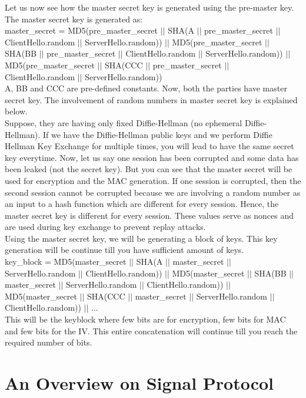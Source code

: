 \documentclass[11pt]{article}
\begin{document}
Let us now see how the master secret key is generated using the pre-master key. The master secret key is generated as:\\
master\_secret = MD5(pre\_master\_secret $||$ SHA(A $||$ pre\_master\_secret $||$ ClientHello.random $||$ ServerHello.random)) $||$ MD5(pre\_master\_secret $||$ SHA(BB $||$ pre\_master\_secret $||$ ClientHello.random $||$ ServerHello.random)) $||$ MD5(pre\_master\_secret $||$ SHA(CCC $||$ pre\_master\_secret $||$ ClientHello.random $||$ ServerHello.random))\\
A, BB and CCC are pre-defined constants. Now, both the parties have master secret key. The involvement of random numbers in master secret key is explained below.\\
\newline
Suppose, they are having only fixed Diffie-Hellman (no ephemeral Diffie-Hellman). If we have the Diffie-Hellman public keys and we perform Diffie Hellman Key Exchange for multiple times, you will lead to have the same secret key everytime. Now, let us say one session has been corrupted and some data has been leaked (not the secret key). But you can see that the master secret will be used for encryption and the MAC generation. If one session is corrupted, then the second session cannot be corrupted because we are involving a random number as an input to a hash function which are different for every session. Hence, the master secret key is different for every session. These values serve as nonces and are used during key exchange to prevent replay attacks.\\
\newline
Using the master secret key, we will be generating a block of keys. This key generation will be continue till you have sufficient amount of keys. \\
key\_block = MD5(master\_secret $||$ SHA(A $||$ master\_secret $||$ ServerHello.random $||$ ClientHello.random)) $||$ MD5(master\_secret $||$ SHA(BB $||$ master\_secret $||$ ServerHello.random $||$ ClientHello.random)) $||$ MD5(master\_secret $||$ SHA(CCC $||$ master\_secret $||$ ServerHello.random $||$ ClientHello.random)) $||$ ...\\
\newline
This will be the keyblock where few bits are for encryption, few bits for MAC and few bits for the IV. This entire concatenation will continue till you reach the required number of bits.



\section{An Overview on Signal Protocol}
\end{document}

